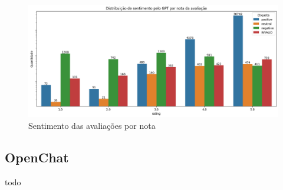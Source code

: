 \begin{figure}
	\centering
	\includegraphics[width=1\textwidth]{figs/gpt/sentimento_nota.png}
	\caption{Sentimento das avaliações por nota}
	\label{img:gpt_sentimento_nota}
\end{figure}


\subsection{OpenChat}
\label{sec:resultados:subsec:openchat}
todo







